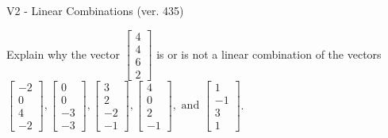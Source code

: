 \begin{exercise}
  \begin{exerciseTitle}V2 - Linear Combinations (ver. 435)\end{exerciseTitle}
  \begin{exerciseStatement}
    Explain why the vector \(\left[\begin{array}{c}
4 \\
4 \\
6 \\
2
\end{array}\right]\)  is or is not a linear 
	combination of the vectors \(\left[\begin{array}{c}
-2 \\
0 \\
4 \\
-2
\end{array}\right] , \left[\begin{array}{c}
0 \\
0 \\
-3 \\
-3
\end{array}\right] , \left[\begin{array}{c}
3 \\
2 \\
-2 \\
-1
\end{array}\right] , \left[\begin{array}{c}
4 \\
0 \\
2 \\
-1
\end{array}\right] , \text{ and } \left[\begin{array}{c}
1 \\
-1 \\
3 \\
1
\end{array}\right]\).
	



\end{exerciseStatement}
\end{exercise}
